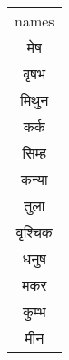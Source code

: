 \begin{table}
\begin{tabular}{c}
names\\
मेष \\
वृषभ \\
मिथुन \\
कर्क \\
सिम्ह \\
कन्या \\
तुला \\
वृश्चिक \\
धनुष \\
मकर \\
कुम्भ \\
मीन \\
\end{tabular} 
\end{table}
